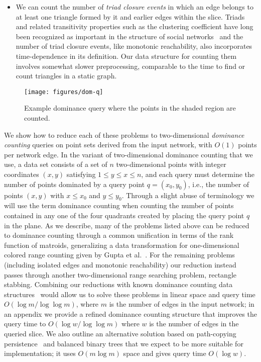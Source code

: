 \documentclass[11pt]{article}
\begin{document}
\begin{itemize}
\item We can count the number of \emph{triad closure events} in which an edge belongs to at least one triangle formed by it and earlier edges within the slice. Triads and related transitivity properties such as the clustering coefficient have long been recognized as important in the structure of social networks~\cite{Gra-AJS-73,Rap-BMB-53} and the number of triad closure events, like monotonic reachability,  also incorporates time-dependence in its definition. Our data structure for counting them involves somewhat slower preprocessing, comparable to the time to find or count triangles in a static graph.
\end{itemize}

\begin{wrapfigure}[14]{r}{0.28\textwidth}
\vspace{-1.5em}
\centering
\texttt{[image: figures/dom-q]}
\vspace{-2em}
\caption{Example dominance query where the points in the shaded region are counted.}
\label{fig:dom-q}
\vspace{-0em}
\end{wrapfigure}
We show how to reduce each of these problems to two-dimensional \emph{dominance counting} queries on point sets derived from the input network, with $O(1)$ points per network edge. In the variant of two-dimensional dominance counting that we use, a data set consists of a set of $n$ two-dimensional points with integer coordinates $(x,y)$ satisfying $1\le y\le x\le n$, and each query must determine the number of points dominated by a query point $q = (x_0, y_0)$, i.e., the number of points $(x, y)$ with $x \leq x_0$ and $y \leq y_0$. Through a slight abuse of terminology we will use the term dominance counting when counting the number of points contained in any one of the four quadrants created by placing the query point $q$ in the plane.  As we describe, many of the problems listed above can be reduced to dominance counting through a common unification in terms of the rank function of matroids,  generalizing a data transformation for one-dimensional colored range counting given by Gupta et al.~\cite{ColorRangeQueries}.
For the remaining problems (including isolated edges and monotonic reachability) our reduction instead passes through another two-dimensional range searching problem, rectangle stabbing. Combining our reductions with known dominance counting data structures~\cite{JaJMorShi-ISAAC-04} would allow us to solve these problems in linear space and query time $O(\log m/\log\log m)$, where $m$ is the number of edges in the input network; in an appendix we provide a refined dominance counting structure that improves the query time to $O(\log w/\log\log m)$ where $w$ is the number of edges in the queried slice. We also outline an alternative solution based on path-copying persistence~\cite{DSPersistent} and balanced binary trees that we expect to be more suitable for implementation; it uses $O(m\log m)$ space and gives query time $O(\log w)$.
\end{document}
